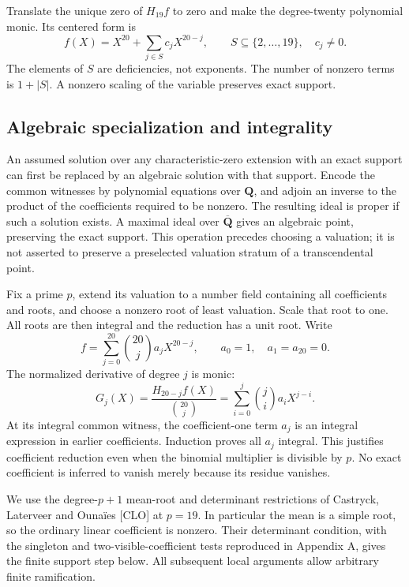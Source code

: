 \documentclass[
  british,
  10pt,
  a4paper,
]{article}
\begin{document}
Translate the unique zero of \(H_{19}f\) to zero and make the
degree-twenty polynomial monic. Its centered form is \[
 f(X)=X^{20}+\sum_{j\in S}c_jX^{20-j},
 \qquad S\subseteq\{2,\ldots,19\},\quad c_j\ne0.
\] The elements of \(S\) are deficiencies, not exponents. The number of
nonzero terms is \(1+|S|\). A nonzero scaling of the variable preserves
exact support.

\subsection{Algebraic specialization and
integrality}\label{algebraic-specialization-and-integrality}

An assumed solution over any characteristic-zero extension with an exact
support can first be replaced by an algebraic solution with that
support. Encode the common witnesses by polynomial equations over
\(\mathbf Q\), and adjoin an inverse to the product of the coefficients
required to be nonzero. The resulting ideal is proper if such a solution
exists. A maximal ideal over \(\overline{\mathbf Q}\) gives an algebraic
point, preserving the exact support. This operation precedes choosing a
valuation; it is not asserted to preserve a preselected valuation
stratum of a transcendental point.

Fix a prime \(p\), extend its valuation to a number field containing all
coefficients and roots, and choose a nonzero root of least valuation.
Scale that root to one. All roots are then integral and the reduction
has a unit root. Write \[
 f=\sum_{j=0}^{20}\binom{20}{j}a_jX^{20-j},
 \qquad a_0=1,\quad a_1=a_{20}=0.
\] The normalized derivative of degree \(j\) is monic: \[
 G_j(X)=\frac{H_{20-j}f(X)}{\binom{20}{j}}
       =\sum_{i=0}^j\binom ji a_iX^{j-i}.
\] At its integral common witness, the coefficient-one term \(a_j\) is
an integral expression in earlier coefficients. Induction proves all
\(a_j\) integral. This justifies coefficient reduction even when the
binomial multiplier is divisible by \(p\). No exact coefficient is
inferred to vanish merely because its residue vanishes.

We use the degree-\(p+1\) mean-root and determinant restrictions of
Castryck, Laterveer and Ounaïes {[}CLO{]} at \(p=19\). In particular the
mean is a simple root, so the ordinary linear coefficient is nonzero.
Their determinant condition, with the singleton and
two-visible-coefficient tests reproduced in Appendix A, gives the finite
support step below. All subsequent local arguments allow arbitrary
finite ramification.
\end{document}
